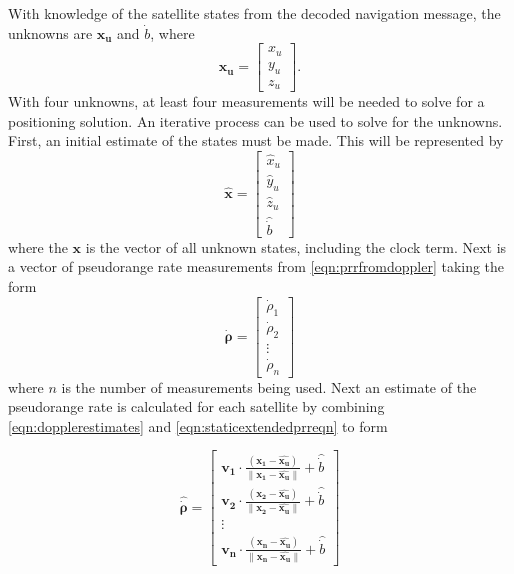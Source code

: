 \documentclass[12pt]{report}
\begin{document}
With knowledge of the satellite states from the decoded navigation message, the unknowns are $\mathbf{x_u}$ and $\dot{b}$, where
\begin{equation}
\mathbf{x_u} = 
\begin{bmatrix}
        x_u\\
        y_u\\
        z_u 
\end{bmatrix}.
\end{equation}
With four unknowns, at least four measurements will be needed to solve for a positioning solution. An iterative process can be used to solve for the unknowns. 
First, an initial estimate of the states must be made. This will be represented by
\begin{equation}
    \mathbf{\hat{x}} = 
    \begin{bmatrix}
        \hat{x}_u\\
        \hat{y}_u\\
        \hat{z}_u\\
        \hat{\dot{b}}
    \end{bmatrix}
    \label{eqn:dopplerestimates}
\end{equation}
where the $\mathbf{x}$ is the vector of all unknown states, including the clock term.
Next is a vector of pseudorange rate measurements from \ref{eqn:prrfromdoppler} taking the form
\begin{equation}
\mathbf{\dot{\rho}} = \begin{bmatrix}
    \dot{\rho}_1 \\
    \dot{\rho}_2 \\
    \vdots\\
    \dot{\rho}_n
\end{bmatrix}
\end{equation}
where $n$ is the number of measurements being used. Next an estimate of the pseudorange rate is calculated for each satellite by combining \ref{eqn:dopplerestimates} and \ref{eqn:staticextendedprreqn} to form 

\begin{equation}
    \mathbf{\hat{\dot{\rho}}} = \begin{bmatrix} 
        \mathbf{v_1} \cdot \frac{(\mathbf{x_1} - \mathbf{\hat{x_u}})}{\| \mathbf{x_1} - \mathbf{\hat{x_u}}\|} + \hat{\dot{b}} \\ 
        \mathbf{v_2} \cdot \frac{(\mathbf{x_2} - \mathbf{\hat{x_u}})}{\| \mathbf{x_2} - \mathbf{\hat{x_u}}\|} + \hat{\dot{b}} \\ 
        \vdots \\
        \mathbf{v_n} \cdot \frac{(\mathbf{x_n} - \mathbf{\hat{x_u}})}{\| \mathbf{x_n} - \mathbf{\hat{x_u}}\|} + \hat{\dot{b}} 
    \end{bmatrix}
    \label{eqn:pseudorangerateEstimate}
\end{equation}
\end{document}
